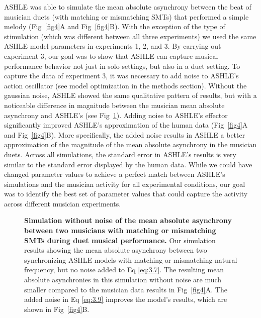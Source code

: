 \documentclass[10pt,letterpaper]{article}
\begin{document}
ASHLE was able to simulate the mean absolute asynchrony between the beat of musician duets (with matching or mismatching SMTs) that performed a simple melody (Fig~\ref{fig4}A and Fig~\ref{fig4}B). With the exception of the type of stimulation (which was different between all three experiments) we used the same ASHLE model parameters in experiments 1, 2, and 3. By carrying out experiment 3, our goal was to show that ASHLE can capture musical performance behavior not just in solo settings, but also in a duet setting. To capture the data of experiment 3, it was necessary to add noise to ASHLE's action oscillator (see model optimization in the methods section). Without the gaussian noise, ASHLE showed the same qualitative pattern of results, but with a noticeable difference in magnitude between the musician mean absolute asynchrony and ASHLE's (see Fig~\ref{fig5}). Adding noise to ASHLE's effector significantly improved ASHLE's approximation of the human data (Fig~\ref{fig4}A and Fig~\ref{fig4}B). More specifically, the added noise results in ASHLE a better approximation of the magnitude of the mean absolute asynchrony in the musician duets. Across all simulations, the standard error in ASHLE's results is very similar to the standard error displayed by the human data. While we could have changed parameter values to achieve a perfect match between ASHLE's simulations and the musician activity for all experimental conditions, our goal was to identify the best set of parameter values that could capture the activity across different musician experiments.

\begin{figure}[!h]
\caption{{\bf Simulation without noise of the mean absolute asynchrony between two musicians with matching or mismatching SMTs during duet musical performance.} Our simulation results showing the mean absolute asynchrony between two synchronizing ASHLE models with matching or mismatching natural frequency, but no noise added to Eq \eqref{eq:3.7}. The resulting mean absolute asynchronies in this simulation without noise are much smaller compared to the musician data results in Fig~\ref{fig4}A. The added noise in Eq \eqref{eq:3.9} improves the model's results, which are shown in Fig~\ref{fig4}B.}
\label{fig5}
\end{figure}
\end{document}
